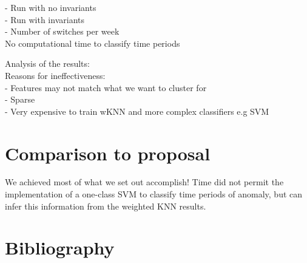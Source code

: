 \documentclass[11pt,letterpaper]{article}
\begin{document}
- Run with no invariants \\

- Run with invariants \\

- Number of switches per week \\


No computational time to classify time periods

Analysis of the results: \\

Reasons for ineffectiveness: \\

- Features may not match what we want to cluster for \\
- Sparse \\ 
- Very expensive to train wKNN and more complex classifiers e.g SVM \\

\section{Comparison to proposal}
We achieved most of what we set out accomplish! Time did not permit the implementation of
a one-class SVM to classify time periods of anomaly, but can infer this information from
the weighted KNN results.

\section*{Bibliography}


%
%
\end{document}
